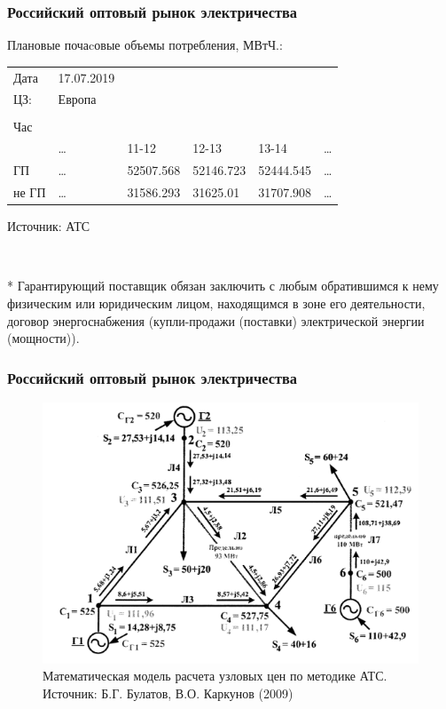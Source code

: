 \documentclass[c, dvipsnames]{beamer}  %
\begin{document}
\begin{frame}[shrink=5]
\frametitle{Российский оптовый рынок электричества} 


Плановые почаcовые объемы потребления, МВтЧ.: 

\begin{table}[]
	\begin{tabular}{llllll}
		Дата & 17.07.2019 &  &  &  &  \\
		ЦЗ: & Европа &  &  &  &  \\
		&  &  &  &  &  \\
		Час &  &  &  &  &  \\
		& … & 11-12 & 12-13 & 13-14 & … \\
		ГП & … & 52507.568 & 52146.723 & 52444.545 & … \\
		не ГП & … & 31586.293 & 31625.01 & 31707.908 & …
	\end{tabular}
\end{table}

Источник: АТС


\

\footnotesize{* Гарантирующий поставщик обязан заключить с любым обратившимся к нему физическим или юридическим лицом, находящимся в зоне его деятельности, договор энергоснабжения (купли-продажи (поставки) электрической энергии (мощности)).
}


\end{frame}




\begin{frame}[shrink=5]
\frametitle{Российский оптовый рынок электричества} 

\begin{figure}
	\centering
	\includegraphics[width=0.8\linewidth]{screenshot022}
	\caption{ Математическая модель расчета узловых цен по методике АТС. Источник: Б.Г. Булатов, В.О. Каркунов (2009)  }
	\label{fig:screenshot015}
\end{figure}



\end{frame}
\end{document}
